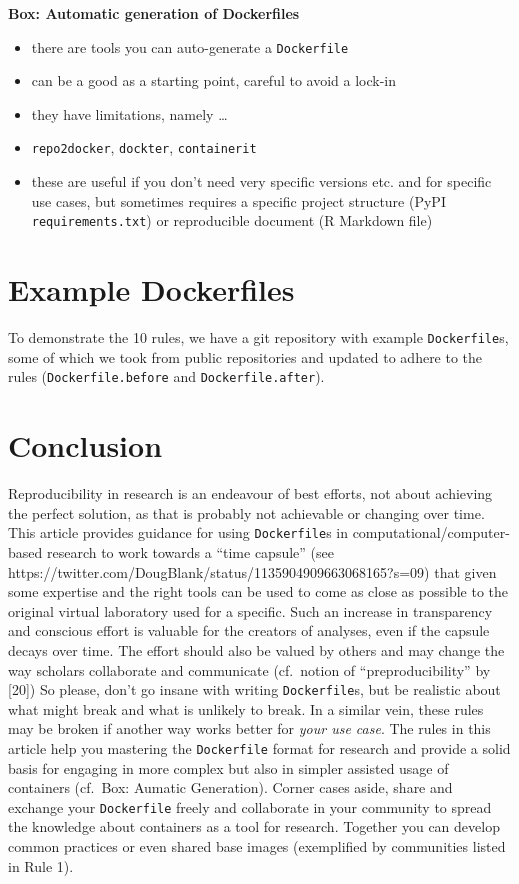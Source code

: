 \documentclass[10pt,letterpaper]{article}
\providecommand{\tightlist}{%
  \setlength{\itemsep}{0pt}\setlength{\parskip}{0pt}}
\begin{document}
\textbf{Box: Automatic generation of Dockerfiles}

\begin{itemize}
\tightlist
\item
  there are tools you can auto-generate a \texttt{Dockerfile}
\item
  can be a good as a starting point, careful to avoid a lock-in
\item
  they have limitations, namely \ldots{}
\item
  \texttt{repo2docker}, \texttt{dockter}, \texttt{containerit}
\item
  these are useful if you don't need very specific versions etc. and for
  specific use cases, but sometimes requires a specific project
  structure (PyPI \texttt{requirements.txt}) or reproducible document (R
  Markdown file)
\end{itemize}

\hypertarget{example-dockerfiles}{%
\section{Example Dockerfiles}\label{example-dockerfiles}}

To demonstrate the 10 rules, we have a git repository with example
\texttt{Dockerfile}s, some of which we took from public repositories and
updated to adhere to the rules (\texttt{Dockerfile.before} and
\texttt{Dockerfile.after}).

\hypertarget{conclusion}{%
\section*{Conclusion}\label{conclusion}}

Reproducibility in research is an endeavour of best efforts, not about
achieving the perfect solution, as that is probably not achievable or
changing over time. This article provides guidance for using
\texttt{Dockerfile}s in computational/computer-based research to work
towards a ``time capsule'' (see
https://twitter.com/DougBlank/status/1135904909663068165?s=09) that
given some expertise and the right tools can be used to come as close as
possible to the original virtual laboratory used for a specific. Such an
increase in transparency and conscious effort is valuable for the
creators of analyses, even if the capsule decays over time. The effort
should also be valued by others and may change the way scholars
collaborate and communicate (cf.~notion of ``preproducibility'' by
{[}20{]}) So please, don't go insane with writing \texttt{Dockerfile}s,
but be realistic about what might break and what is unlikely to break.
In a similar vein, these rules may be broken if another way works better
for \emph{your use case}. The rules in this article help you mastering
the \texttt{Dockerfile} format for research and provide a solid basis
for engaging in more complex but also in simpler assisted usage of
containers (cf.~Box: Aumatic Generation). Corner cases aside, share and
exchange your \texttt{Dockerfile} freely and collaborate in your
community to spread the knowledge about containers as a tool for
research. Together you can develop common practices or even shared base
images (exemplified by communities listed in Rule 1).
\end{document}
